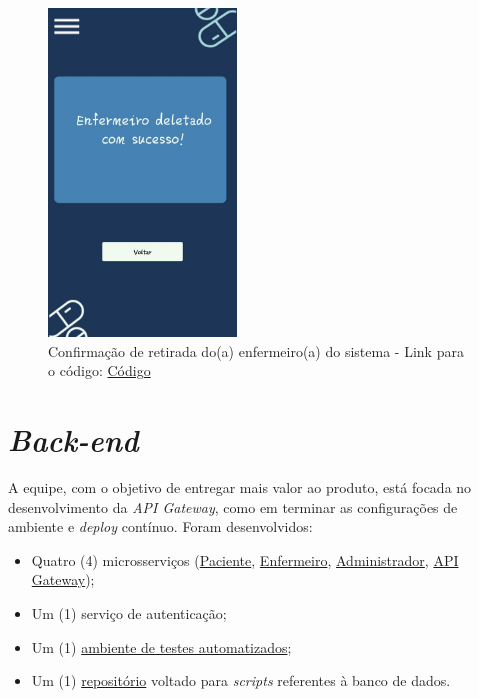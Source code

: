 \begin{apendicesenv}
\begin{figure}[H]
    \centering
    \includegraphics[width=5cm]{figuras/software/telas_frontend/front_ConfirmarEnfermeiroDeletado.jpg}
    \caption{Confirmação de retirada do(a) enfermeiro(a) do sistema - Link para o código: \href{https://github.com/PillWatcher/pillwatcher-dpf-service/blob/dev/components/confirmarEnfermeiroDeletado.js}{Código}}
    \label{fig:confirmar_retirada_enfermeiro}
\end{figure}



\section{\textit{Back-end}}

A equipe, com o objetivo de entregar mais valor ao produto, está focada no desenvolvimento da \textit{API Gateway}, como em terminar as configurações de ambiente e \textit{deploy} contínuo.
Foram desenvolvidos:
\begin{itemize}
    \item Quatro (4) microsserviços (\href{https://github.com/PillWatcher/pillwatcher-dpb-patient-service}{Paciente}, \href{https://github.com/PillWatcher/pillwatcher-dpb-nursing-service}{Enfermeiro}, \href{https://github.com/PillWatcher/pillwatcher-dpb-admin-service}{Administrador}, \href{https://github.com/PillWatcher/pillwatcher-api-gateway}{API Gateway});
    \item Um (1) serviço de autenticação;
    \item Um (1) \href{https://github.com/PillWatcher/postman-config}{ambiente de testes automatizados};
    \item Um (1) \href{https://github.com/PillWatcher/database-scripts}{repositório} voltado para \textit{scripts} referentes à banco de dados.
\end{itemize}


\end{apendicesenv}

